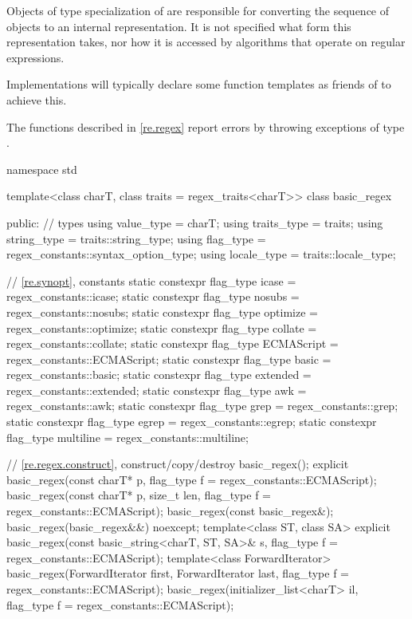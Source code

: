 \pnum
Objects of type specialization of  are responsible for
converting the sequence of  objects to an internal
representation. It is not specified what form this representation
takes, nor how it is accessed by algorithms that operate on regular
expressions.
\begin{note}
Implementations will typically declare
some function templates as friends of  to achieve
this.
\end{note}

\pnum
{}%
The functions described in \ref{re.regex} report errors by throwing
exceptions of type .

%
\begin{codeblock}
namespace std {
  template<class charT, class traits = regex_traits<charT>>
    class basic_regex {
    public:
      // types
      using value_type  = charT;
      using traits_type = traits;
      using string_type = traits::string_type;
      using flag_type   = regex_constants::syntax_option_type;
      using locale_type = traits::locale_type;

      // \ref{re.synopt}, constants
      static constexpr flag_type icase = regex_constants::icase;
      static constexpr flag_type nosubs = regex_constants::nosubs;
      static constexpr flag_type optimize = regex_constants::optimize;
      static constexpr flag_type collate = regex_constants::collate;
      static constexpr flag_type ECMAScript = regex_constants::ECMAScript;
      static constexpr flag_type basic = regex_constants::basic;
      static constexpr flag_type extended = regex_constants::extended;
      static constexpr flag_type awk = regex_constants::awk;
      static constexpr flag_type grep = regex_constants::grep;
      static constexpr flag_type egrep = regex_constants::egrep;
      static constexpr flag_type multiline = regex_constants::multiline;

      // \ref{re.regex.construct}, construct/copy/destroy
      basic_regex();
      explicit basic_regex(const charT* p, flag_type f = regex_constants::ECMAScript);
      basic_regex(const charT* p, size_t len, flag_type f = regex_constants::ECMAScript);
      basic_regex(const basic_regex&);
      basic_regex(basic_regex&&) noexcept;
      template<class ST, class SA>
        explicit basic_regex(const basic_string<charT, ST, SA>& s,
                             flag_type f = regex_constants::ECMAScript);
      template<class ForwardIterator>
        basic_regex(ForwardIterator first, ForwardIterator last,
                    flag_type f = regex_constants::ECMAScript);
      basic_regex(initializer_list<charT> il, flag_type f = regex_constants::ECMAScript);

}}
\end{codeblock}
